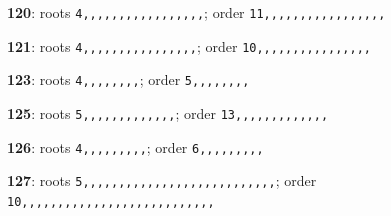\noindent \textbf{120}: roots \texttt{4,,,,,,,,,,,,,,,,,}; order \texttt{11,,,,,,,,,,,,,,,,,}\par
\noindent \textbf{121}: roots \texttt{4,,,,,,,,,,,,,,,,}; order \texttt{10,,,,,,,,,,,,,,,,}\par
\noindent \textbf{123}: roots \texttt{4,,,,,,,,}; order \texttt{5,,,,,,,,}\par
\noindent \textbf{125}: roots \texttt{5,,,,,,,,,,,,,}; order \texttt{13,,,,,,,,,,,,,}\par
\noindent \textbf{126}: roots \texttt{4,,,,,,,,,}; order \texttt{6,,,,,,,,,}\par
\noindent \textbf{127}: roots \texttt{5,,,,,,,,,,,,,,,,,,,,,,,,,,,}; order \texttt{10,,,,,,,,,,,,,,,,,,,,,,,,,,,}\par
